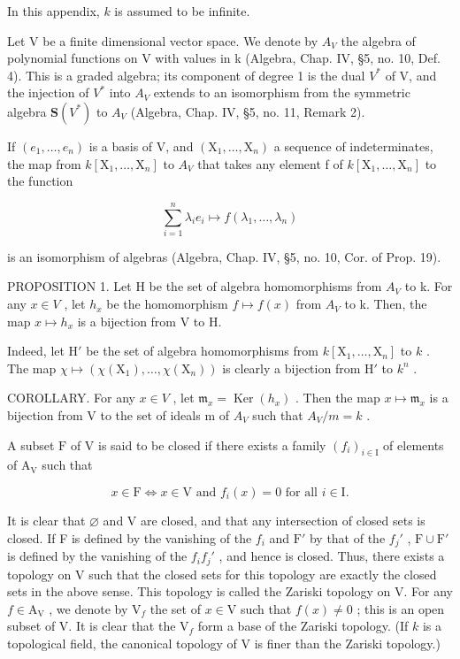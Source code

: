 
In this appendix, \(k\) is assumed to be infinite.


Let V be a finite dimensional vector space. We denote by \(A_{V}\) the algebra of polynomial functions on V with values in k (Algebra, Chap. IV, §5, no. 10, Def. 4). This is a graded algebra; its component of degree 1 is the dual \(V^{*}\) of V, and the injection of \(V^{*}\) into \(A_{V}\) extends to an isomorphism from the symmetric algebra \(\mathbf{S}(V^{*})\) to \(A_{V}\) (Algebra, Chap. IV, §5, no. 11, Remark 2).

If \((e_{1},\ldots,e_{n})\) is a basis of V, and \((\mathrm{X}_{1},\ldots,\mathrm{X}_{n})\) a sequence of indeterminates, the map from \(k[\mathrm{X}_{1},\ldots,\mathrm{X}_{n}]\) to \(A_{V}\) that takes any element f of \(k[\mathrm{X}_{1},\ldots,\mathrm{X}_{n}]\) to the function

\[
\sum_ {i = 1} ^ {n} \lambda_ {i} e _ {i} \mapsto f (\lambda_ {1}, \ldots , \lambda_ {n})
\]

is an isomorphism of algebras (Algebra, Chap. IV, §5, no. 10, Cor. of Prop. 19).

PROPOSITION 1. Let H be the set of algebra homomorphisms from \(A_{V}\) to k. For any \(x \in V\) , let \(h_{x}\) be the homomorphism \(f \mapsto f(x)\) from \(A_{V}\) to k. Then, the map \(x \mapsto h_{x}\) is a bijection from V to H.

Indeed, let \(\mathrm{H}'\) be the set of algebra homomorphisms from \(k[\mathrm{X}_1,\ldots ,\mathrm{X}_n]\) to \(k\) . The map \(\chi \mapsto (\chi (\mathrm{X}_1),\dots ,\chi (\mathrm{X}_n))\) is clearly a bijection from \(\mathrm{H}'\) to \(k^n\) .

COROLLARY. For any \(x \in V\) , let \(\mathfrak{m}_{x} = \operatorname{Ker}(h_{x})\) . Then the map \(x \mapsto \mathfrak{m}_{x}\) is a bijection from V to the set of ideals m of \(A_{V}\) such that \(A_{V}/m = k\) .

A subset \(\mathrm{F}\) of \(\mathrm{V}\) is said to be closed if there exists a family \((f_i)_{i\in \mathrm{I}}\) of elements of \(\mathrm{A_V}\) such that

\[
x \in \mathrm{F} \Longleftrightarrow x \in \mathrm{V} \text {   and   } f _ {i} (x) = 0 \text {   for   all   } i \in \mathrm{I}.
\]

It is clear that \(\varnothing\) and V are closed, and that any intersection of closed sets is closed. If F is defined by the vanishing of the \(f_{i}\) and \(\mathrm{F}'\) by that of the \(f_j'\) , \(\mathrm{F} \cup \mathrm{F}'\) is defined by the vanishing of the \(f_{i}f_{j}'\) , and hence is closed. Thus, there exists a topology on V such that the closed sets for this topology are exactly the closed sets in the above sense. This topology is called the Zariski topology on V. For any \(f \in \mathrm{A_V}\) , we denote by \(\mathrm{V}_f\) the set of \(x \in \mathrm{V}\) such that \(f(x) \neq 0\) ; this is an open subset of V. It is clear that the \(\mathrm{V}_f\) form a base of the Zariski topology. (If \(k\) is a topological field, the canonical topology of V is finer than the Zariski topology.)

